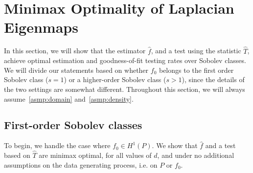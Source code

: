 \documentclass{article}
\newcommand{\1}{\mathbf{1}}
\newcommand{\wh}[1]{\widehat{#1}}
\theoremstyle{alden}
\theoremstyle{aldenthm}
\theoremstyle{definition}
\theoremstyle{remark}
\begin{document}
\section{Minimax Optimality of Laplacian Eigenmaps}
\label{sec:minimax_optimal_laplacian_eigenmaps}

In this section, we will show that the estimator $\wh{f}$, and a test using the statistic $\wh{T}$, achieve optimal estimation and goodness-of-fit testing rates over Sobolev classes. We will divide our statements based on whether $f_0$ belongs to the first order Sobolev class ($s = 1$) or a higher-order Sobolev class ($s > 1$), since the details of the two settings are somewhat different. Throughout this section, we will always assume~\ref{asmp:domain} and~\ref{asmp:density}.

\subsection{First-order Sobolev classes}
\label{sec:first_order_sobolev_classes}
To begin, we handle the case where $f_0 \in H^1(P)$. We show that $\wh{f}$ and a test based on $\wh{T}$ are minimax optimal, for all values of $d$, and under no additional assumptions on the data generating process, i.e. on $P$ or $f_0$. 
\end{document}
